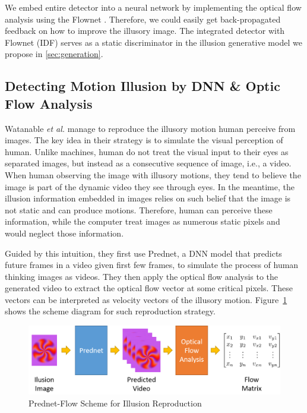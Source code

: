 \documentclass[journal]{IEEEtran}
\begin{document}
We embed entire detector into a neural network by implementing the optical flow analysis using the Flownet \cite{ilg2017flownet}.
Therefore, we could easily get back-propagated feedback on how to improve the illusory image.
The integrated detector with Flownet (IDF) serves as a static discriminator in the illusion generative model we propose in \cref{sec:generation}.

\subsection{Detecting Motion Illusion by DNN \& Optic Flow Analysis}
\label{sec:detection_dnn}
Watanable \textit{et al.} \cite{watanable2018illusory} manage to reproduce the illusory motion human perceive from images.
The key idea in their strategy is to simulate the visual perception of human.
Unlike machines, human do not treat the visual input to their eyes as separated images, but instead as a consecutive sequence of image, i.e., a video.
When human observing the image with illusory motions, they tend to believe the image is part of the dynamic video they see through eyes.
In the meantime, the illusion information embedded in images relies on such belief that the image is not static and can produce motions.
Therefore, human can perceive these information, while the computer treat images as numerous static pixels and would neglect those information.

Guided by this intuition, they first use Prednet, a DNN model that predicts future frames in a video given first few frames, to simulate the process of human thinking images as videos.
They then apply the optical flow analysis to the generated video to extract the optical flow vector at some critical pixels.
These vectors can be interpreted as velocity vectors of the illusory motion.
Figure~\ref{fig:scheme} shows the scheme diagram for such reproduction strategy.

\begin{figure}[h]
	\centering
	\includegraphics[width=\linewidth]{fig/pred-flow-procedure.png}
	\caption{Prednet-Flow Scheme for Illusion Reproduction}
	\label{fig:scheme}
\end{figure}
\end{document}
